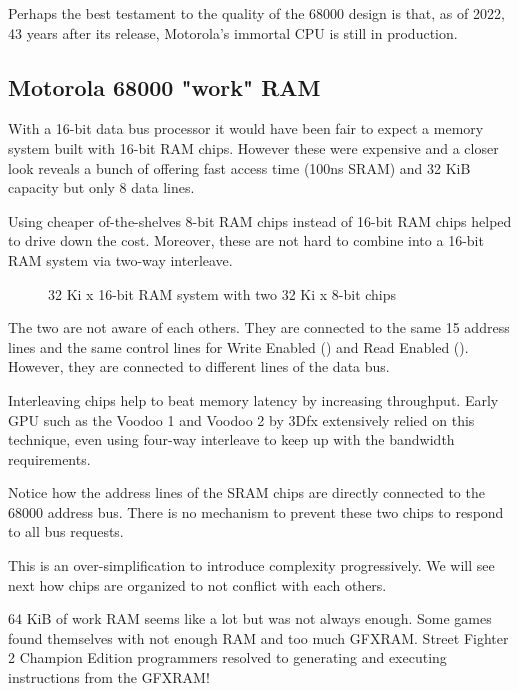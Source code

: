 Perhaps the best testament to the quality of the 68000 design is that, as of 2022, 43 years after its release, Motorola's immortal CPU is still in production.


\subsection{Motorola 68000 "work" RAM}
With a 16-bit data bus processor it would have been fair to expect a memory system built with 16-bit RAM chips. However these were expensive and a closer look reveals a bunch of  offering fast access time (100ns SRAM) and 32 KiB capacity but only 8 data lines.

\pagebreak

Using cheaper of-the-shelves 8-bit RAM chips instead of 16-bit RAM chips helped to drive down the cost. Moreover, these are not hard to combine into a 16-bit RAM system via two-way interleave.

\begin{figure}[H]
\caption*{32 Ki x 16-bit RAM system with two 32 Ki x 8-bit chips}
\end{figure}

The two  are not aware of each others. They are connected to the same 15 address lines and the same control lines for Write Enabled () and Read Enabled (). However, they are connected to different lines of the data bus.


 \begin{trivia}
Interleaving chips help to beat memory latency by increasing throughput. Early GPU such as the Voodoo 1 and Voodoo 2 by 3Dfx extensively relied on this technique, even using four-way interleave to keep up with the bandwidth requirements\cite{TheStoryOf3Dfx}.  
 \end{trivia}


Notice how the address lines of the SRAM chips are directly connected to the 68000 address bus. There is no mechanism to prevent these two chips to respond to all bus requests. 

This is an over-simplification to introduce complexity progressively. We will see next how chips are organized to not conflict with each others.

 \begin{trivia}
 64 KiB of work RAM seems like a lot but was not always enough. Some games found themselves with not enough RAM and too much GFXRAM. Street Fighter 2 Champion Edition programmers resolved to generating and executing instructions from the GFXRAM\cite{mame_driver}!
 \end{trivia}
\pagebreak








